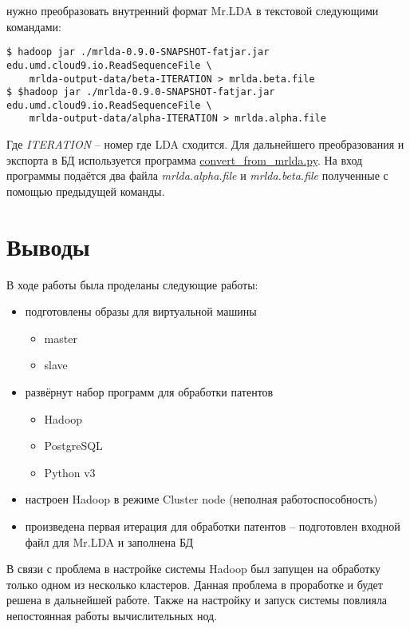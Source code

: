 нужно преобразовать внутренний формат Mr.LDA в текстовой следующими командами:
\begin{lstlisting}
$ hadoop jar ./mrlda-0.9.0-SNAPSHOT-fatjar.jar edu.umd.cloud9.io.ReadSequenceFile \
    mrlda-output-data/beta-ITERATION > mrlda.beta.file
$ $hadoop jar ./mrlda-0.9.0-SNAPSHOT-fatjar.jar edu.umd.cloud9.io.ReadSequenceFile \
    mrlda-output-data/alpha-ITERATION > mrlda.alpha.file
\end{lstlisting}
Где \emph{ITERATION} -- номер где LDA сходится. Для дальнейшего преобразования и экспорта в БД используется 
программа 
\href{https://github.com/SemPatent/Golubev/blob/master/convert_from_mrlda.py}{convert\_from\_mrlda.py}. На 
вход программы подаётся два файла \emph{mrlda.alpha.file} и \emph{mrlda.beta.file} полученные с помощью 
предыдущей команды.

\newpage

\chapter{Выводы}
В ходе работы была проделаны следующие работы:
\begin{itemize}
    \item подготовлены образы для виртуальной машины
    \begin{itemize}
        \item master
        \item slave
    \end{itemize}
    \item развёрнут набор программ для обработки патентов
    \begin{itemize}
        \item Hadoop
        \item PostgreSQL
        \item Python v3
    \end{itemize}
    \item настроен Hadoop в режиме Cluster node (неполная работоспособность)
    \item произведена первая итерация для обработки патентов -- подготовлен входной файл 
        для Mr.LDA и заполнена БД
\end{itemize}
В связи с проблема в настройке системы Hadoop был запущен на обработку только одном из несколько кластеров.
Данная проблема в проработке и будет решена в дальнейшей работе. Также на настройку и запуск системы 
повлияла непостоянная работы вычислительных нод.

